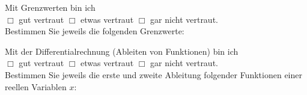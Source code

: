 \documentclass[12pt]{exam}
\begin{document}
\begin{questions}
Mit Grenzwerten bin ich\\ $\Box$ gut vertraut \hfill $\Box$ etwas vertraut \hfill $\Box$ gar nicht vertraut. \\[2ex]
Bestimmen Sie jeweils die folgenden Grenzwerte:\\


\pagebreak
{}

Mit der Differentialrechnung (Ableiten von Funktionen) bin ich\\ $\Box$ gut vertraut \hfill $\Box$ etwas vertraut \hfill $\Box$ gar nicht vertraut. \\[2ex]
Bestimmen Sie jeweils die erste und zweite Ableitung folgender
Funktionen einer reellen Variablen $x$:\\

\begin{parts}


\end{parts}
\end{questions}
\end{document}
